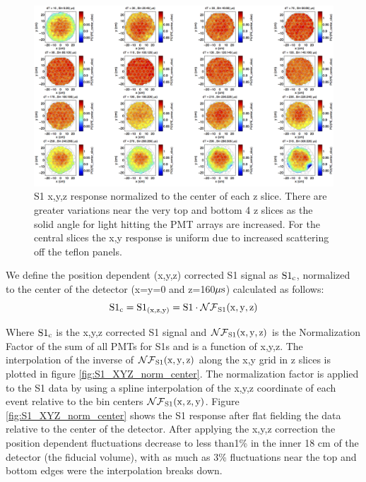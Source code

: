 \begin{figure}[h!]\centering
\includegraphics[width=150mm]{Chapter_XYZ_Corr/Thesis_Corr_Plots/S1_XYZ_Kr_norm_center_slice_crop.png}
\caption{S1 x,y,z response normalized to the center of each z slice. There are greater variations near the very top and bottom 4 z slices as the solid angle for light hitting the PMT arrays are increased. For the central slices the x,y response is uniform due to increased scattering off the teflon panels. }
\label{fig:S1_XYZ_norm_center_slice}
\end{figure}

We define the position dependent  (x,y,z) corrected S1 signal as $\rm S1{_c}$, normalized to the center of the detector (x=y=0 and z=160$\rm \mu s$) calculated as follows:
\begin{equation}
\rm S1_{c}= S1_{(x,z,y)}=S1 \cdot \mathcal{NF}_{S1}(x,y,z)
\label{eq:S1_XYZ}
\end{equation}

Where $\rm S1_{c}$ is the x,y,z corrected S1 signal and $\rm \mathcal{NF}_{S1}(x,y,z)$ is the Normalization Factor of the sum of all PMTs for S1s and is a function of x,y,z. The interpolation of the inverse of $\rm \mathcal{NF}_{S1}(x,y,z)$ along the x,y grid in z slices is plotted in figure \ref{fig:S1_XYZ_norm_center}. The normalization factor is applied to the S1 data by using a spline interpolation of the x,y,z coordinate of each event relative to the bin centers $\rm \mathcal{NF}_{S1}(x,z,y)$. Figure \ref{fig:S1_XYZ_norm_center} shows the S1 response after flat fielding the data relative to the center of the detector. After applying the x,y,z correction the position dependent fluctuations decrease to less than1\% in the inner 18 cm of the detector (the fiducial volume), with as much as 3\% fluctuations near the top and bottom edges were the interpolation breaks down.

